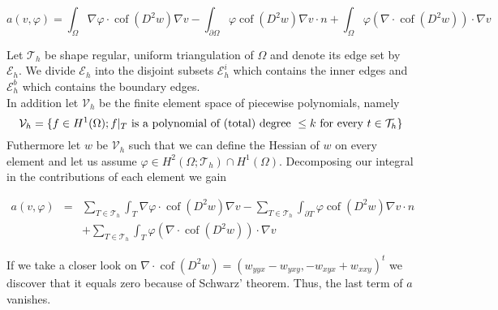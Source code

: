 \documentclass[a4paper,11pt]{article}
\newcommand{\myint}{\displaystyle\int}
\newcommand{\cof}{\operatorname{cof}}
\newcommand{\triang}{\mathcal{T}_h}
\begin{document}

\[
	a(v,\varphi) = \myint_{\Omega} \nabla \varphi \cdot \cof(D^2 w) \nabla v - \myint_{\partial \Omega} \varphi\cof(D^2 w) \nabla v \cdot n 
	+  \myint_\Omega \varphi (\nabla \cdot \cof(D^2 w)) \cdot \nabla v
\]


Let $\mathcal{T}_h$ be shape regular, uniform triangulation of $\Omega$ and denote its edge set by $\mathcal{E}_h$. We divide $\mathcal E _h $ into the disjoint subsets $\mathcal{E}_h^i$ which contains the inner edges and $\mathcal{E}_h^b$ which contains the boundary edges. \\
In addition let $\mathcal V_h$ be the finite element space of piecewise polynomials, namely
\[
	\mathcal V_h = \{ f \in H^1(\Omega); f \arrowvert_T \textnormal{ is a polynomial of (total) degree } \leq k \textnormal{ for every } t \in \mathcal T_h\}
\]
Futhermore let $w$ be $\mathcal V_h$ such that we can define the Hessian of $w$ on every element and let us assume $\varphi \in H^2(\Omega; \triang) \cap H^1(\Omega)$.
 Decomposing our integral in the contributions of each element we gain

\begin{eqnarray*}
a(v, \varphi) &=& \sum_{T \in \triang} \myint_T \nabla \varphi \cdot \cof(D^2 w) \nabla v - \sum_{T \in \triang}\myint_{\partial T} \varphi \cof(D^2 w) \nabla v \cdot n \\
	&&+  \sum_{T \in \triang} \myint_T \varphi (\nabla \cdot \cof(D^2 w)) \cdot \nabla v
\end{eqnarray*}

If we take a closer look on $\nabla \cdot \cof(D^2 w) = \left( w_{yyx}-w_{yxy}, -w_{xyx} + w_{xxy} \right)^t$ we discover that it equals zero because of Schwarz' theorem. Thus, the last term of $a$ vanishes.
\end{document}
